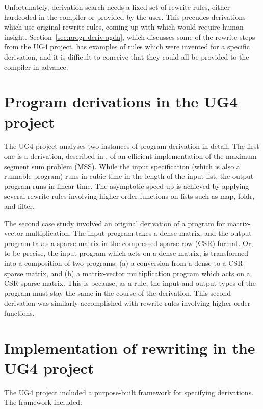 \documentclass[bsc,frontabs,oneside,singlespacing,parskip,deptreport]{infthesis}
\theoremstyle{definition}
\theoremstyle{lemma}
\begin{document}
Unfortunately, derivation search needs a fixed set of rewrite rules,
either hardcoded in the compiler or provided by the user. This
precudes derivations which use original rewrite rules, coming up with
which would require human insight. Section~\ref{sec:progr-deriv-agda},
which discusses some of the rewrite steps from the UG4 project, has
examples of rules which were invented for a specific derivation, and
it is difficult to conceive that they could all be provided to the
compiler in advance.

\section{Program derivations in the UG4 project}
\label{sec:progr-deriv-ug4}

The UG4 project analyses two instances of program derivation in
detail. The first one is a derivation, described in
\cite{gibbons1994introduction}, of an efficient implementation of the
maximum segment sum problem (MSS). While the input specification
(which is also a runnable program) runs in cubic time in the length of
the input list, the output program runs in linear time. The asymptotic
speed-up is achieved by applying several rewrite rules involving
higher-order functions on lists such as map, foldr, and filter.

The second case study involved an original derivation of a program for
matrix-vector multiplication. The input program takes a dense matrix,
and the output program takes a sparse matrix in the compressed sparse
row (CSR) format. Or, to be precise, the input program which acts on a
dense matrix, is transformed into a composition of two programs: (a) a
conversion from a dense to a CSR-sparse matrix, and (b) a
matrix-vector multiplication program which acts on a CSR-sparse
matrix. This is because, as a rule, the input and output types of the
program must stay the same in the course of the derivation. This
second derivation was similarly accomplished with rewrite rules
involving higher-order functions.

\section{Implementation of rewriting in the UG4 project}
\label{sec:impl-rewr-ug4}

The UG4 project included a purpose-built framework for specifying
derivations. The framework included:
\end{document}
